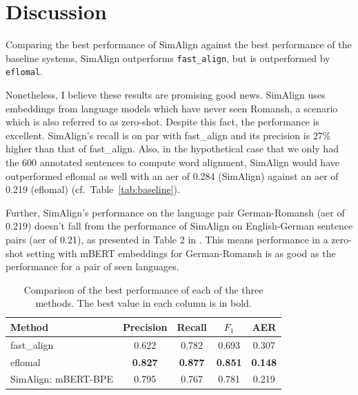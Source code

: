 \section{Discussion}
Comparing the best performance of SimAlign against the best performance of the baseline systems, SimAlign outperforms \texttt{fast\_align}, but is outperformed by \texttt{eflomal}.

Nonetheless, I believe these results are promising good news. 
SimAlign uses embeddings from language models which have never seen Romansh, a scenario which is also referred to as zero-shot. 
Despite this fact, the performance is excellent. 
SimAlign's recall is on par with fast\_align and its precision is 27\% higher than that of fast\_align. 
Also, in the hypothetical case that we only had the 600 annotated sentences to compute word alignment, SimAlign would have outperformed eflomal as well with an \acrshort{aer} of 0.284 (SimAlign) against an \acrshort{aer} of 0.219 (eflomal) (cf.~Table~\ref{tab:baseline}). 

Further,  SimAlign's performance on the language pair German-Romansh (\acrshort{aer} of 0.219) doesn't fall from the performance of SimAlign on English-German sentence pairs (\acrshort{aer} of 0.21),  as presented in Table 2 in \cite{jalili-sabet-etal-2020-simalign}. This means performance in a zero-shot setting  with mBERT embeddings  for German-Romansh is as good as the performance for a pair of seen languages.

\begin{table}
\centering
\begin{tabular}{lcccc}
	\toprule
							Method & Precision & Recall & $F_1$ & AER \\
\midrule
  fast\_align& 0.622	  & 0.782  & 0.693 & 0.307 \\

							eflomal     & \textbf{0.827} & \textbf{0.877} & \textbf{0.851} & \textbf{0.148} \\

SimAlign:                     mBERT-BPE & 0.795   & 0.767  & 0.781  & 0.219 \\
\bottomrule
\end{tabular}
\caption{Comparison of the best performance of each of the three methods. 
The best value in each column is in bold.}
\label{tab:comparison}
\end{table}

